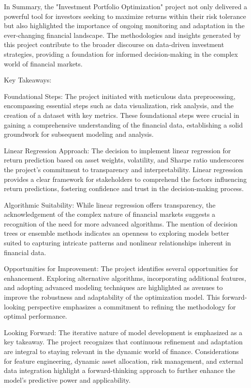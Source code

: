 \documentclass[conference]{IEEEtran}
\begin{document}
In Summary, the "Investment Portfolio Optimization" project not only delivered a powerful tool for investors seeking to maximize returns within their risk tolerance but also highlighted the importance of ongoing monitoring and adaptation in the ever-changing financial landscape. The methodologies and insights generated by this project contribute to the broader discourse on data-driven investment strategies, providing a foundation for informed decision-making in the complex world of financial markets. 

Key Takeaways:

Foundational Steps:
The project initiated with meticulous data preprocessing, encompassing essential steps such as data visualization, risk analysis, and the creation of a dataset with key metrics. These foundational steps were crucial in gaining a comprehensive understanding of the financial data, establishing a solid groundwork for subsequent modeling and analysis.

Linear Regression Approach:
The decision to implement linear regression for return prediction based on asset weights, volatility, and Sharpe ratio underscores the project's commitment to transparency and interpretability. Linear regression provides a clear framework for stakeholders to comprehend the factors influencing return predictions, fostering confidence and trust in the decision-making process.

Algorithmic Suitability:
While linear regression offers transparency, the acknowledgement of the complex nature of financial markets suggests a recognition of the need for more advanced algorithms. The mention of decision trees or ensemble methods indicates an openness to exploring models better suited to capturing intricate patterns and nonlinear relationships inherent in financial data.

Opportunities for Improvement:
The project identifies several opportunities for enhancement. Exploring alternative algorithms, incorporating additional features, and adopting advanced modeling techniques are highlighted as avenues to improve the robustness and adaptability of the optimization model. This forward-looking perspective emphasizes a commitment to refining the methodology for optimal performance.

Looking Forward:
The iterative nature of model development is emphasized as a key takeaway. The project recognizes that continuous refinement and adaptation are integral to staying relevant in the dynamic world of finance. Considerations for feature engineering, dynamic asset allocation, risk management, and external data integration highlight a forward-thinking approach to further enhance the model’s predictive power and applicability.
\end{document}
